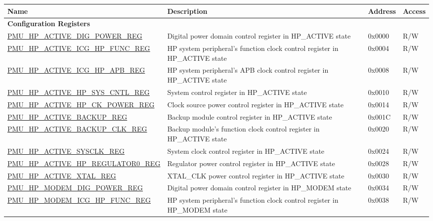 \begin{longtable}{ | l | p{6cm} | p{1.3cm} | p{1.5cm} | }
\hline\rowcolor{lightgray}
\textbf{Name} & \textbf{Description} &  \textbf{Address} & \textbf{Access} \\ \hline
\endhead
\multicolumn{4}{|l|}{\textbf{Configuration Registers}} \\ \hline
\hyperref[regdesc:PMUHPACTIVEDIGPOWERREG]{PMU\_HP\_ACTIVE\_DIG\_POWER\_REG} & Digital power domain control register in HP\_ACTIVE state & 0x0000 & R/W \\ \hline
\hyperref[regdesc:PMUHPACTIVEICGHPFUNCREG]{PMU\_HP\_ACTIVE\_ICG\_HP\_FUNC\_REG} &  HP system peripheral's function clock control register in HP\_ACTIVE state & 0x0004 & R/W \\ \hline
\hyperref[regdesc:PMUHPACTIVEICGHPAPBREG]{PMU\_HP\_ACTIVE\_ICG\_HP\_APB\_REG} &  HP system peripheral's APB clock control register in HP\_ACTIVE state & 0x0008 & R/W \\ \hline
\hyperref[regdesc:PMUHPACTIVEHPSYSCNTLREG]{PMU\_HP\_ACTIVE\_HP\_SYS\_CNTL\_REG} &  System control register in HP\_ACTIVE state & 0x0010 & R/W \\ \hline
\hyperref[regdesc:PMUHPACTIVEHPCKPOWERREG]{PMU\_HP\_ACTIVE\_HP\_CK\_POWER\_REG} &  Clock source power control register in HP\_ACTIVE state& 0x0014 & R/W \\ \hline
\hyperref[regdesc:PMUHPACTIVEBACKUPREG]{PMU\_HP\_ACTIVE\_BACKUP\_REG} &  Backup module control register in HP\_ACTIVE state& 0x001C & R/W \\ \hline
\hyperref[regdesc:PMUHPACTIVEBACKUPCLKREG]{PMU\_HP\_ACTIVE\_BACKUP\_CLK\_REG} &  Backup module's function clock control register in HP\_ACTIVE state & 0x0020 & R/W \\ \hline
\hyperref[regdesc:PMUHPACTIVESYSCLKREG]{PMU\_HP\_ACTIVE\_SYSCLK\_REG} &  System clock control register in HP\_ACTIVE state & 0x0024 & R/W \\ \hline
\hyperref[regdesc:PMUHPACTIVEHPREGULATOR0REG]{PMU\_HP\_ACTIVE\_HP\_REGULATOR0\_REG} & Regulator power control register in HP\_ACTIVE state & 0x0028 & R/W \\ \hline
\hyperref[regdesc:PMUHPACTIVEXTALREG]{PMU\_HP\_ACTIVE\_XTAL\_REG} &  XTAL\_CLK power control register in HP\_ACTIVE state& 0x0030 & R/W \\ \hline
\hyperref[regdesc:PMUHPMODEMDIGPOWERREG]{PMU\_HP\_MODEM\_DIG\_POWER\_REG} &  Digital power domain control register in HP\_MODEM state & 0x0034 & R/W \\ \hline
\hyperref[regdesc:PMUHPMODEMICGHPFUNCREG]{PMU\_HP\_MODEM\_ICG\_HP\_FUNC\_REG} & HP system peripheral's function clock control register in HP\_MODEM state & 0x0038 & R/W \\ \hline

\end{longtable}
